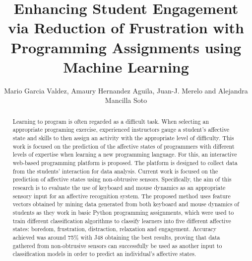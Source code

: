 \documentclass[a4paper]{llncs}
\begin{document}
\title{Enhancing Student Engagement via Reduction of Frustration with Programming Assignments using Machine Learning}

\author{Mario Garcia Valdez, Amaury Hernandez Aguila, Juan-J. Merelo and Alejandra Mancilla Soto}

\maketitle

\begin{abstract} 

Learning to program is often regarded as a difficult task. When
selecting an appropriate programing exercise, experienced instructors gauge a
student’s affective state and skills to then assign an activity with the  appropriate level
of difficulty. This work is focused on the prediction of the affective states
of programmers with different levels of expertise when learning a new
programming language. For this, an interactive web-based programming platform
is proposed. The platform is designed to collect data from the students'
interaction for data analysis. Current work is focused on the prediction of
affective states using non-obtrusive sensors. Specifically,  the aim of this research 
is to evaluate the use of keyboard and mouse dynamics as an appropriate 
sensory input for an affective recognition
system. The proposed method uses feature vectors obtained by mining  data 
generated from both keyboard and mouse dynamics of students as they 
work in basic Python programming assignments, which were used to train different
classification algorithms to classify learners into five different affective states: boredom,
frustration, distraction, relaxation and engagement. Accuracy achieved was around 75\% with J48 obtaining the best results, proving that data gathered from non-obtrusive sensors can successfully be used
as another input to classification models in order to predict an individual's
affective states.
\end{abstract}
\end{document}
